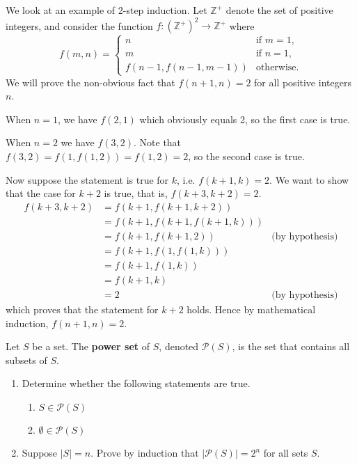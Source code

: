 \begin{example}
    We look at an example of 2-step induction. Let $\mathbb{Z}^+$ denote the set of positive integers, and consider the function $f: \left(\mathbb{Z}^+\right)^2\to\mathbb{Z}^+$ where
    \[
        f(m, n) =
        \begin{cases}
            n & \text{if } m = 1, \\
            m & \text{if } n = 1, \\
            f\left(n-1,f(n-1,m-1)\right) & \text{otherwise.}
        \end{cases}
    \]
    We will prove the non-obvious fact that $f(n+1, n) = 2$ for all positive integers $n$.

    When $n = 1$, we have $f(2, 1)$ which obviously equals 2, so the first case is true.

    When $n = 2$ we have $f(3, 2)$. Note that $f(3,2) = f(1, f(1, 2)) = f(1, 2) = 2$, so the second case is true.

    Now suppose the statement is true for $k$, i.e. $f(k+1,k) = 2$. We want to show that the case for $k+2$ is true, that is, $f(k+3, k+2) = 2$.
    \begin{align*}
        f(k+3, k+2) &= f(k+1, f(k+1, k+2))\\
        &= f(k+1, f(k+1, f(k+1, k)))\\
        &= f(k+1, f(k+1, 2)) & \text{(by hypothesis)}\\
        &= f(k+1, f(1, f(1, k)))\\
        &= f(k+1, f(1, k))\\
        &= f(k+1, k)\\
        &= 2 & \text{(by hypothesis)}
    \end{align*}
    which proves that the statement for $k+2$ holds. Hence by mathematical induction, $f(n+1, n) = 2$.
\end{example}

\begin{exercise}
    Let $S$ be a set. The \textbf{power set} of $S$, denoted $\mathcal{P}(S)$, is the set that contains all subsets of $S$.
    \begin{enumerate}[label=(\roman*)]
        \item Determine whether the following statements are true.
        \begin{enumerate}[label=(\alph*)]
            \item $S \in \mathcal{P}(S)$
            \item $\emptyset \in \mathcal{P}(S)$
        \end{enumerate}
        \item Suppose $|S| = n$. Prove by induction that $|\mathcal{P}(S)| = 2^n$ for all sets $S$.
    \end{enumerate}
\end{exercise}

